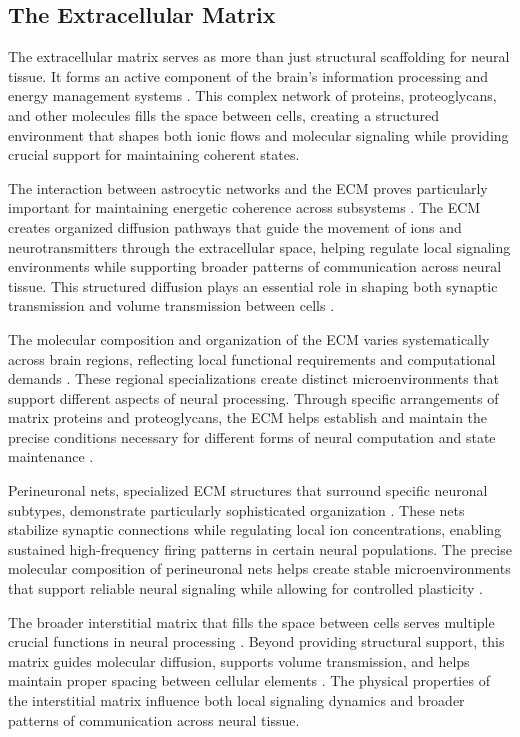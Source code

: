 \begin{refsection}
\section{The Extracellular Matrix}

The extracellular matrix serves as more than just structural scaffolding for neural tissue. It forms an active component of the brain's information processing and energy management systems \cite{Dityatev2010}. This complex network of proteins, proteoglycans, and other molecules fills the space between cells, creating a structured environment that shapes both ionic flows and molecular signaling while providing crucial support for maintaining coherent states.

The interaction between astrocytic networks and the ECM proves particularly important for maintaining energetic coherence across subsystems \cite{Song2018}. The ECM creates organized diffusion pathways that guide the movement of ions and neurotransmitters through the extracellular space, helping regulate local signaling environments while supporting broader patterns of communication across neural tissue. This structured diffusion plays an essential role in shaping both synaptic transmission and volume transmission between cells \cite{Sykova2008}.

The molecular composition and organization of the ECM varies systematically across brain regions, reflecting local functional requirements and computational demands \cite{Bandtlow2000}. These regional specializations create distinct microenvironments that support different aspects of neural processing. Through specific arrangements of matrix proteins and proteoglycans, the ECM helps establish and maintain the precise conditions necessary for different forms of neural computation and state maintenance \cite{Zimmermann2008}.

Perineuronal nets, specialized ECM structures that surround specific neuronal subtypes, demonstrate particularly sophisticated organization \cite{Wang2012}. These nets stabilize synaptic connections while regulating local ion concentrations, enabling sustained high-frequency firing patterns in certain neural populations. The precise molecular composition of perineuronal nets helps create stable microenvironments that support reliable neural signaling while allowing for controlled plasticity \cite{Kwok2011}.

The broader interstitial matrix that fills the space between cells serves multiple crucial functions in neural processing \cite{Ruoslahti1996}. Beyond providing structural support, this matrix guides molecular diffusion, supports volume transmission, and helps maintain proper spacing between cellular elements \cite{Nicholson1998}. The physical properties of the interstitial matrix influence both local signaling dynamics and broader patterns of communication across neural tissue.


\end{refsection}
